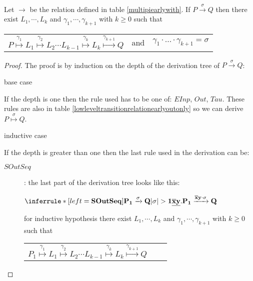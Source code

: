 \begin{proposition}\label{equivalencehightolow}
  Let $\rightarrow$ be the relation defined in table \ref{multipiearlywith}. If $P\xrightarrow{\sigma} Q$ then there exist $L_{1}, \cdots, L_{k}$ and $\gamma_{1}, \cdots, \gamma_{k+1}$ with $k\geq 0$ such that 
  \begin{center}
    \begin{tabular}{lll}
      $P \stackrel{\gamma_{1}}{\longmapsto} L_{1} \stackrel{\gamma_{2}}{\longmapsto} L_{2} \cdots L_{k-1} \stackrel{\gamma_{k}}{\longmapsto} L_{k} \stackrel{\gamma_{k+1}}{\longmapsto} Q$ 
    &
      and
    &
      $\gamma_{1} \cdot \ldots \cdot \gamma_{k+1} = \sigma$  
    \end{tabular}
  \end{center}
  \begin{proof}
    The proof is by induction on the depth of the derivation tree of $P\xrightarrow{\sigma} Q$:
    \begin{description}
      \item[base case]
    \end{description}
	If the depth is one then the rule used has to be one of: $EInp$, $Out$, $Tau$. These rules are also in table \ref{lowleveltransitionrelationearlyoutonly} so we can derive $P \stackrel{\sigma}{\longmapsto}Q$.
    \begin{description}
      \item[inductive case]
    \end{description}
	If the depth is greater than one then the last rule used in the derivation can be:
	\begin{description}
	  \item[$SOutSeq$]: 
	    the last part of the derivation tree looks like this:
	    \begin{center}
	      $\inferrule* [left=\bf{SOutSeq}]{
		  P_{1} \xrightarrow{\sigma} Q
		\\
		  |\sigma|>1
	      }{
		\underline{\overline{x}y}.P_{1} \xrightarrow{\overline{x}y \cdot \sigma} Q
	      }$	      
	    \end{center}
	    for inductive hypothesis there exist $L_{1}, \cdots, L_{k}$ and $\gamma_{1}, \cdots, \gamma_{k+1}$ with $k\geq 0$ such that 
	    \begin{center}
	      \begin{tabular}{lll}
		$P_{1} \stackrel{\gamma_{1}}{\longmapsto} L_{1} \stackrel{\gamma_{2}}{\longmapsto} L_{2} \cdots L_{k-1} \stackrel{\gamma_{k}}{\longmapsto} L_{k} \stackrel{\gamma_{k+1}}{\longmapsto} Q$ 

\end{tabular}
\end{center}
\end{description}
\end{proof}
\end{proposition}
